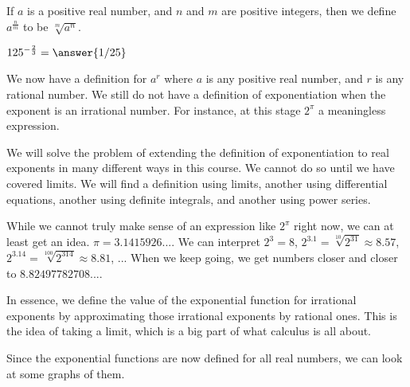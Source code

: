 \documentclass{ximera}
\begin{document}
\begin{definition}
If $a$ is a positive real number, and $n$ and $m$ are positive integers, then we define $a^{\frac{n}{m}}$ to be $\sqrt[m]{a^n}$.
\end{definition}

\begin{question}
	 $125^{-\frac{2}{3}} = \answer{1/25}$
\end{question}

We now have a definition for $a^r$ where $a$ is any positive real number, and $r$ is any rational number.  We still do not have a definition of exponentiation when the exponent is an irrational number.  For instance, at this stage $2^\pi$ a meaningless expression.  

We will solve the problem of extending the definition of exponentiation to real exponents in many different ways in this course.  We cannot do so until we have covered limits.  We will find a definition using limits, another using differential equations,  another using definite integrals, and another using power series.

While we cannot truly make sense of an expression like $2^\pi$ right now, we can at least get an idea.  $\pi = 3.1415926...$.  We can interpret $2^3 = 8 $,  $2^{3.1} = \sqrt[10]{2^{31}} \approx 8.57$, $2^{3.14} = \sqrt[100]{2^{314}} \approx 8.81$, ...
When we keep going, we get numbers closer and closer to $8.82497782708...$.  

In essence, we define the value of the exponential function for irrational exponents by approximating those irrational exponents by rational ones.  This is the idea of taking a limit, which is a big part of what calculus is all about.

Since the exponential functions are now defined for all real numbers, we can look at some graphs of them.
\end{document}
